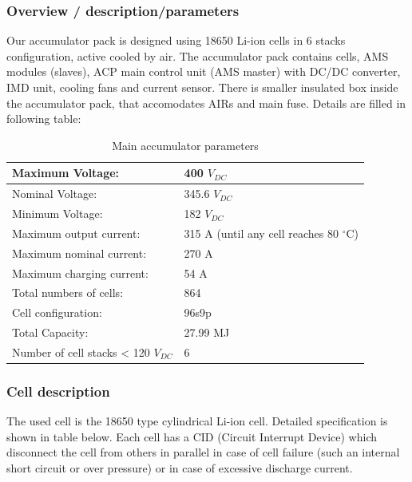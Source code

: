 \subsubsection{Overview / description/parameters}
Our accumulator pack is designed using 18650 Li-ion cells in 6 stacks configuration, active cooled by air. The accumulator pack contains cells, AMS modules (slaves), ACP main control unit (AMS master) with DC/DC converter, IMD unit, cooling fans and current sensor. There is smaller insulated box inside the accumulator pack, that accomodates AIRs and main fuse.
Details are filled in following table:

\begin{table}[H]
	\centering
	\caption{Main accumulator parameters}
	\begin{tabularx}{\textwidth}{|X|X|}
		\hline
		Maximum Voltage: & 400 $V_{DC}$ \\[\TableSize]
		\hline
		Nominal Voltage: & 345.6 $V_{DC}$ \\[\TableSize]
		\hline
		Minimum Voltage: & 182 $V_{DC}$ \\[\TableSize]
		\hline
		Maximum output current: & 315 A (until any cell reaches 80 $^\circ$C) \\[\TableSize]
		\hline
		Maximum nominal current: & 270 A \\[\TableSize]
		\hline
		Maximum charging current: & 54 A \\[\TableSize]
		\hline
		Total numbers of cells: & 864 \\[\TableSize]
		\hline
		Cell configuration: & 96s9p \\[\TableSize]
		\hline
		Total Capacity: & 27.99 MJ \\[\TableSize]
		\hline
		Number of cell stacks < 120 $V_{DC}$ & 6 \\[\TableSize]
		\hline
	\end{tabularx}%
	\label{tab:acc-main}%
\end{table}%

\subsubsection{Cell description}

The used cell is the 18650 type cylindrical Li-ion cell. Detailed specification is shown in table below. Each cell has a CID (Circuit Interrupt Device) which disconnect the cell from others in parallel in case of cell failure (such an internal short circuit or over pressure) or in case of excessive discharge current. 

